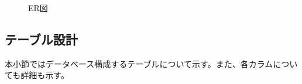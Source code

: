 \documentclass[a4j]{jarticle}
\begin{document}
\begin{figure}[H]
\begin{center}
\caption{ER図}
\label{}
\end{center}
\end{figure}
\newpage

\subsection{テーブル設計}
本小節ではデータベース構成するテーブルについて示す。また、各カラムについても詳細も示す。
\end{document}
